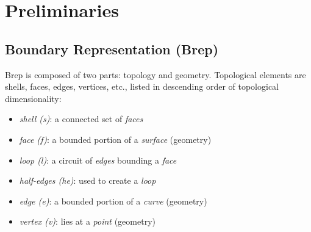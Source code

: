 \documentclass[11pt,a4paper]{article}
\newtheorem{remark}[theorem]{Remark}
\newcommand{\Hk}[1]{H_{#1}}           %
\begin{document}
\section{Preliminaries}\label{sec_preliminaries}


\subsection{Boundary Representation (Brep)}

Brep is composed of two parts: topology and geometry. Topological elements
are shells, faces, edges, vertices, etc., listed in descending order of
topological dimensionality:

\begin{itemize}[noitemsep,topsep=2pt,parsep=2pt,partopsep=2pt]
\item \emph{shell (s)}: a connected set of \emph{faces}
\item \emph{face (f)}: a bounded portion of a \emph{surface} (geometry)
\item \emph{loop (l)}: a circuit of \emph{edges} bounding a \emph{face}
\item \emph{half-edges (he)}: used to create a \emph{loop}
\item \emph{edge (e)}: a bounded portion of a \emph{curve} (geometry)
\item \emph{vertex (v)}: lies at a \emph{point} (geometry)
\end{itemize}

%
\end{document}
